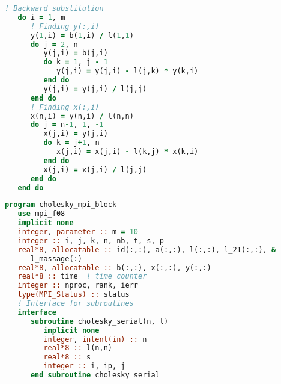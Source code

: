 \newpage
\begin{lstlisting}[language=fortran, style=fortran, label={listing:backward_substitution}, caption={Последовательная реализация обратной подстановки на современном Фортране.}]
! Backward substitution
   do i = 1, m
      ! Finding y(:,i)
      y(1,i) = b(1,i) / l(1,1)
      do j = 2, n
         y(j,i) = b(j,i)
         do k = 1, j - 1
            y(j,i) = y(j,i) - l(j,k) * y(k,i)
         end do
         y(j,i) = y(j,i) / l(j,j)
      end do
      ! Finding x(:,i)
      x(n,i) = y(n,i) / l(n,n)
      do j = n-1, 1, -1
         x(j,i) = y(j,i)
         do k = j+1, n
            x(j,i) = x(j,i) - l(k,j) * x(k,i)
         end do
         x(j,i) = x(j,i) / l(j,j)
      end do 
   end do
\end{lstlisting}

\newpage
\begin{lstlisting}[language=fortran, style=fortran, label={listing:cholesky_mpi_block}, caption={Исходный код оптимизированного с помощью MPI алгоритма решения задачи \eqref{eq:1} с помощью блочного разложения Холецкого на современном Фортране.}]
program cholesky_mpi_block
   use mpi_f08
   implicit none
   integer, parameter :: m = 10
   integer :: i, j, k, n, nb, t, s, p
   real*8, allocatable :: id(:,:), a(:,:), l(:,:), l_21(:,:), &
      l_massage(:)
   real*8, allocatable :: b(:,:), x(:,:), y(:,:)
   real*8 :: time  ! time counter
   integer :: nproc, rank, ierr
   type(MPI_Status) :: status
   ! Interface for subroutines
   interface
      subroutine cholesky_serial(n, l)
         implicit none
         integer, intent(in) :: n
         real*8 :: l(n,n)
         real*8 :: s
         integer :: i, ip, j
      end subroutine cholesky_serial


\end{lstlisting}
